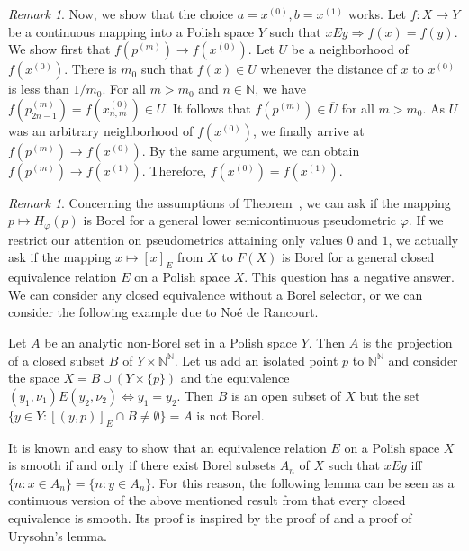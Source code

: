 \documentclass[a4paper]{amsart}
\theoremstyle{plain}
\theoremstyle{remark}
\newtheorem{remark}[theorem]{Remark}
\begin{document}
\begin{remark}
Now, we show that the choice $ a = x^{(0)}, b = x^{(1)} $ works. Let $ f : X \to Y $ be a continuous mapping into a Polish space $ Y $ such that $ x E y \Rightarrow f(x) = f(y) $. We show first that $ f(p^{(m)}) \to f(x^{(0)}) $. Let $ U $ be a neighborhood of $ f(x^{(0)}) $. There is $ m_{0} $ such that $ f(x) \in U $ whenever the distance of $ x $ to $ x^{(0)} $ is less than $ 1/m_{0} $. For all $ m > m_{0} $ and $ n \in \mathbb{N} $, we have $ f(p^{(m)}_{2n-1}) = f(x^{(0)}_{n, m}) \in U $. It follows that $ f(p^{(m)}) \in \overline{U} $ for all $ m > m_{0} $. As $ U $ was an arbitrary neighborhood of $ f(x^{(0)}) $, we finally arrive at $ f(p^{(m)}) \to f(x^{(0)}) $. By the same argument, we can obtain $ f(p^{(m)}) \to f(x^{(1)}) $. Therefore, $ f(x^{(0)}) = f(x^{(1)}) $.
\end{remark}


\begin{remark} \label{remarknonmeas}
Concerning the assumptions of Theorem~, we can ask if the mapping $ p \mapsto H_{\varphi}(p) $ is Borel for a general lower semicontinuous pseudometric $ \varphi $. If we restrict our attention on pseudometrics attaining only values $ 0 $ and $ 1 $, we actually ask if the mapping $ x \mapsto [x]_{E} $ from $ X $ to $ F(X) $ is Borel for a general closed equivalence relation $ E $ on a Polish space $ X $. This question has a negative answer. We can consider any closed equivalence without a Borel selector, or we can consider the following example due to No\'e de Rancourt.

Let $ A $ be an analytic non-Borel set in a Polish space $ Y $. Then $ A $ is the projection of a closed subset $ B $ of $ Y \times \mathbb{N}^{\mathbb{N}} $. Let us add an isolated point $ p $ to $ \mathbb{N}^{\mathbb{N}} $ and consider the space $ X = B \cup (Y \times \{ p \}) $ and the equivalence $ (y_{1}, \nu_{1}) E (y_{2}, \nu_{2}) \Leftrightarrow y_{1} = y_{2} $. Then $ B $ is an open subset of $ X $ but the set $ \{ y \in Y : [(y, p)]_{E} \cap B \neq \emptyset \} = A $ is not Borel.
\end{remark}


It is known and easy to show that an equivalence relation $ E $ on a Polish space $ X $ is smooth if and only if there exist Borel subsets $ A_{n} $ of $ X $ such that $ xEy $ iff $ \{ n : x \in A_{n} \} = \{ n : y \in A_{n} \} $. For this reason, the following lemma can be seen as a continuous version of the above mentioned result from \cite{haloke} that every closed equivalence is smooth. Its proof is inspired by the proof of \cite[Lemma~5.1]{haloke} and a proof of Urysohn's lemma.
\end{document}

